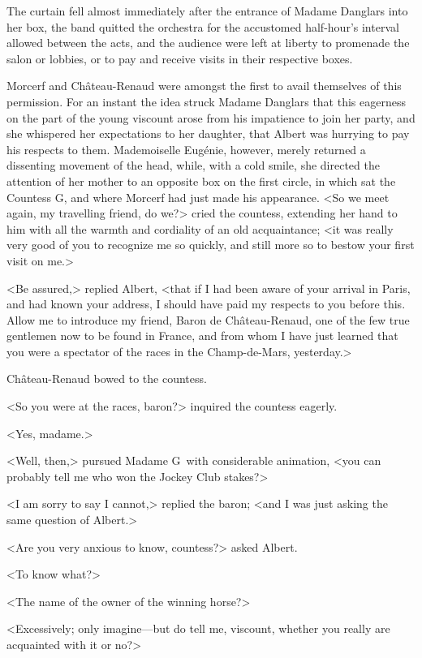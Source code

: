  The curtain fell almost immediately after the entrance of Madame Danglars into her box, the band quitted the orchestra for the accustomed half-hour's interval allowed between the acts, and the audience were left at liberty to promenade the salon or lobbies, or to pay and receive visits in their respective boxes. 

 Morcerf and Château-Renaud were amongst the first to avail themselves of this permission. For an instant the idea struck Madame Danglars that this eagerness on the part of the young viscount arose from his impatience to join her party, and she whispered her expectations to her daughter, that Albert was hurrying to pay his respects to them. Mademoiselle Eugénie, however, merely returned a dissenting movement of the head, while, with a cold smile, she directed the attention of her mother to an opposite box on the first circle, in which sat the Countess G\doubleemdash, and where Morcerf had just made his appearance.  <So we meet again, my travelling friend, do we?> cried the countess, extending her hand to him with all the warmth and cordiality of an old acquaintance; <it was really very good of you to recognize me so quickly, and still more so to bestow your first visit on me.> 

 <Be assured,> replied Albert, <that if I had been aware of your arrival in Paris, and had known your address, I should have paid my respects to you before this. Allow me to introduce my friend, Baron de Château-Renaud, one of the few true gentlemen now to be found in France, and from whom I have just learned that you were a spectator of the races in the Champ-de-Mars, yesterday.> 

 Château-Renaud bowed to the countess. 

 <So you were at the races, baron?> inquired the countess eagerly. 

 <Yes, madame.> 

 <Well, then,> pursued Madame G\doubleemdash~with considerable animation, <you can probably tell me who won the Jockey Club stakes?> 

 <I am sorry to say I cannot,> replied the baron; <and I was just asking the same question of Albert.> 

 <Are you very anxious to know, countess?> asked Albert. 

 <To know what?> 

 <The name of the owner of the winning horse?> 

 <Excessively; only imagine—but do tell me, viscount, whether you really are acquainted with it or no?> 

